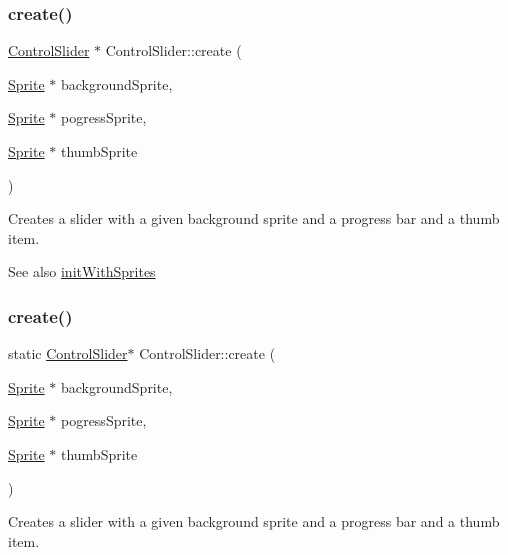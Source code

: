 \subsubsection{\texorpdfstring{create()}{create()}\hspace{0.1cm}{\footnotesize\ttfamily [3/8]}}
{\footnotesize\ttfamily \hyperlink{classControlSlider}{Control\+Slider} $\ast$ Control\+Slider\+::create (\begin{DoxyParamCaption}\item[{\hyperlink{classSprite}{Sprite} $\ast$}]{background\+Sprite,  }\item[{\hyperlink{classSprite}{Sprite} $\ast$}]{pogress\+Sprite,  }\item[{\hyperlink{classSprite}{Sprite} $\ast$}]{thumb\+Sprite }\end{DoxyParamCaption})\hspace{0.3cm}{\ttfamily [static]}}

Creates a slider with a given background sprite and a progress bar and a thumb item.

\begin{DoxySeeAlso}{See also}
\hyperlink{classControlSlider_ad0ff5ce559475048d32b4406a0930da1}{init\+With\+Sprites} 
\end{DoxySeeAlso}
\mbox{\label{classControlSlider_a1fe3890d14909cd8b1cc878f74ec9d8a}} 
\subsubsection{\texorpdfstring{create()}{create()}\hspace{0.1cm}{\footnotesize\ttfamily [4/8]}}
{\footnotesize\ttfamily static \hyperlink{classControlSlider}{Control\+Slider}$\ast$ Control\+Slider\+::create (\begin{DoxyParamCaption}\item[{\hyperlink{classSprite}{Sprite} $\ast$}]{background\+Sprite,  }\item[{\hyperlink{classSprite}{Sprite} $\ast$}]{pogress\+Sprite,  }\item[{\hyperlink{classSprite}{Sprite} $\ast$}]{thumb\+Sprite }\end{DoxyParamCaption})\hspace{0.3cm}{\ttfamily [static]}}

Creates a slider with a given background sprite and a progress bar and a thumb item.


